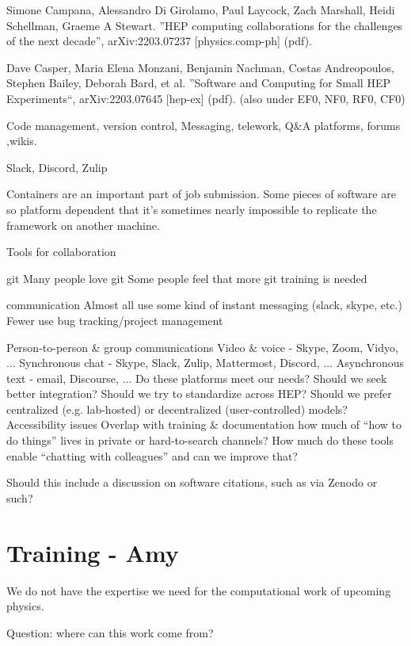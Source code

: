 Simone Campana, Alessandro Di Girolamo, Paul Laycock, Zach Marshall, Heidi Schellman, Graeme A Stewart. ”HEP computing collaborations for the challenges of the next decade”, arXiv:2203.07237 [physics.comp-ph] (pdf).

Dave Casper, Maria Elena Monzani, Benjamin Nachman, Costas Andreopoulos, Stephen Bailey, Deborah Bard, et al. ”Software and Computing for Small HEP Experiments“, arXiv:2203.07645 [hep-ex] (pdf). (also under EF0, NF0, RF0, CF0)



Code management, version control, Messaging, telework, Q\&A platforms, forums ,wikis.

Slack, Discord, Zulip 

Containers are an important part of job submission.
Some pieces of software are so platform dependent that it's sometimes nearly impossible to replicate the framework on another machine.

Tools for collaboration

git
Many people love git
Some people feel that more git training is needed

communication
Almost all use some kind of instant messaging (slack, skype, etc.)
Fewer use bug tracking/project management

Person-to-person \& group communications
Video \& voice - Skype, Zoom, Vidyo, ...
Synchronous chat - Skype, Slack, Zulip, Mattermost, Discord, ...
Asynchronous text - email, Discourse, ...
Do these platforms meet our needs? Should we seek better integration? Should we try to standardize across HEP?
Should we prefer centralized (e.g. lab-hosted) or decentralized (user-controlled) models?
Accessibility issues
Overlap with training \& documentation
how much of “how to do things” lives in private or hard-to-search channels?
How much do these tools enable “chatting with colleagues” and can we improve that?

Should this include a discussion on software citations, such as via Zenodo or such?

\section{Training - Amy}

We do not have the expertise we need for the computational work of upcoming physics.

Question: where can this work come from?

